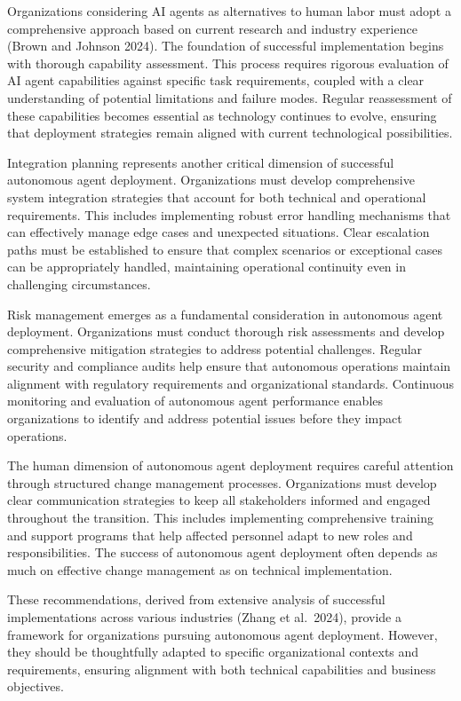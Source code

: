 \documentclass[
]{article}
\begin{document}
Organizations considering AI agents as alternatives to human labor must
adopt a comprehensive approach based on current research and industry
experience (Brown and Johnson 2024). The foundation of successful
implementation begins with thorough capability assessment. This process
requires rigorous evaluation of AI agent capabilities against specific
task requirements, coupled with a clear understanding of potential
limitations and failure modes. Regular reassessment of these
capabilities becomes essential as technology continues to evolve,
ensuring that deployment strategies remain aligned with current
technological possibilities.

Integration planning represents another critical dimension of successful
autonomous agent deployment. Organizations must develop comprehensive
system integration strategies that account for both technical and
operational requirements. This includes implementing robust error
handling mechanisms that can effectively manage edge cases and
unexpected situations. Clear escalation paths must be established to
ensure that complex scenarios or exceptional cases can be appropriately
handled, maintaining operational continuity even in challenging
circumstances.

Risk management emerges as a fundamental consideration in autonomous
agent deployment. Organizations must conduct thorough risk assessments
and develop comprehensive mitigation strategies to address potential
challenges. Regular security and compliance audits help ensure that
autonomous operations maintain alignment with regulatory requirements
and organizational standards. Continuous monitoring and evaluation of
autonomous agent performance enables organizations to identify and
address potential issues before they impact operations.

The human dimension of autonomous agent deployment requires careful
attention through structured change management processes. Organizations
must develop clear communication strategies to keep all stakeholders
informed and engaged throughout the transition. This includes
implementing comprehensive training and support programs that help
affected personnel adapt to new roles and responsibilities. The success
of autonomous agent deployment often depends as much on effective change
management as on technical implementation.

These recommendations, derived from extensive analysis of successful
implementations across various industries (Zhang et al.~2024), provide a
framework for organizations pursuing autonomous agent deployment.
However, they should be thoughtfully adapted to specific organizational
contexts and requirements, ensuring alignment with both technical
capabilities and business objectives.
\end{document}
